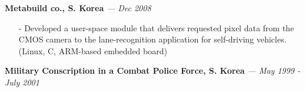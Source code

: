 {\bf Metabuild co., S. Korea}
{\it \footnotesize --- Dec 2008}
\begin{itemize}[leftmargin=*]
\setlength\itemsep{-0.02in}
 \item[-] Developed a user-space module that delivers requested pixel data from the CMOS camera
          to the lane-recognition application for self-driving vehicles.
          {\small(Linux, C, ARM-based embedded board)}
\end{itemize}
\vspace{-0.15in}

{\bf Military Conscription in a Combat Police Force, S. Korea}
{\it \footnotesize --- May 1999 - July 2001}

